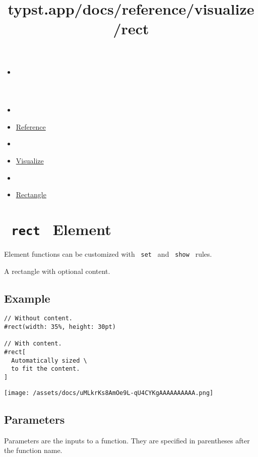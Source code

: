 \title{typst.app/docs/reference/visualize/rect}

\begin{itemize}
\tightlist
\item
  \href{/docs}{}
\item
  
\item
  \href{/docs/reference/}{Reference}
\item
  
\item
  \href{/docs/reference/visualize/}{Visualize}
\item
  
\item
  \href{/docs/reference/visualize/rect/}{Rectangle}
\end{itemize}

\section{\texorpdfstring{\texttt{\ rect\ } {{ Element
}}}{ rect   Element }}\label{summary}

\label{element-tooltip}
Element functions can be customized with \texttt{\ set\ } and
\texttt{\ show\ } rules.

A rectangle with optional content.

\subsection{Example}\label{example}

\begin{verbatim}
// Without content.
#rect(width: 35%, height: 30pt)

// With content.
#rect[
  Automatically sized \
  to fit the content.
]
\end{verbatim}

\texttt{[image: /assets/docs/uMLkrKs8AmOe9L-qU4CYKgAAAAAAAAAA.png]}

\subsection{\texorpdfstring{{ Parameters
}}{ Parameters }}\label{parameters}

\label{parameters-tooltip}
Parameters are the inputs to a function. They are specified in
parentheses after the function name.

